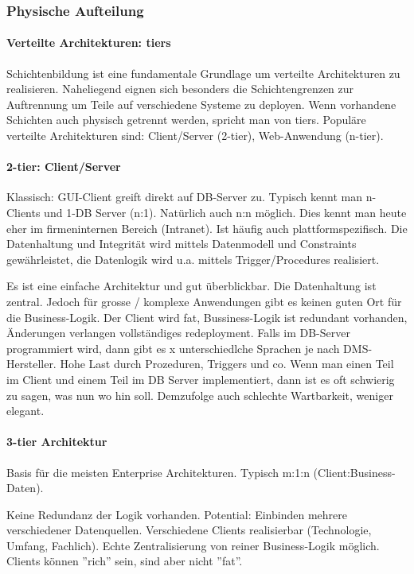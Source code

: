 \subsubsection{Physische Aufteilung}
\paragraph{Verteilte Architekturen: tiers} Schichtenbildung ist eine fundamentale Grundlage um verteilte Architekturen zu realisieren. Naheliegend eignen sich besonders die Schichtengrenzen zur Auftrennung um Teile auf verschiedene Systeme zu deployen. Wenn vorhandene Schichten auch physisch getrennt werden, spricht man von tiers. Populäre verteilte Architekturen sind: Client/Server (2-tier), Web-Anwendung (n-tier).

\paragraph{2-tier: Client/Server}
Klassisch: GUI-Client greift direkt auf DB-Server zu. Typisch kennt man n-Clients und 1-DB Server (n:1). Natürlich auch n:n möglich. Dies kennt man heute eher im firmeninternen Bereich (Intranet). Ist häufig auch plattformspezifisch. Die Datenhaltung und Integrität wird mittels Datenmodell und Constraints gewährleistet, die Datenlogik wird u.a. mittels Trigger/Procedures realisiert.

Es ist eine einfache Architektur und gut überblickbar. Die Datenhaltung ist zentral. Jedoch für grosse / komplexe Anwendungen gibt es keinen guten Ort für die Business-Logik. Der Client wird fat, Bussiness-Logik ist redundant vorhanden, Änderungen verlangen vollständiges redeployment. Falls im DB-Server programmiert wird, dann gibt es x unterschiedlche Sprachen je nach DMS-Hersteller. Hohe Last durch Prozeduren, Triggers und co. Wenn man einen Teil im Client und einem Teil im DB Server implementiert, dann ist es oft schwierig zu sagen, was nun wo hin soll. Demzufolge auch schlechte Wartbarkeit, weniger elegant.

\paragraph{3-tier Architektur}
Basis für die meisten Enterprise Architekturen. Typisch m:1:n (Client:Business-Daten).

Keine Redundanz der Logik vorhanden. Potential: Einbinden mehrere verschiedener Datenquellen. Verschiedene Clients realisierbar (Technologie, Umfang, Fachlich). Echte Zentralisierung von reiner Business-Logik möglich. Clients können ''rich'' sein, sind aber nicht ''fat''.

